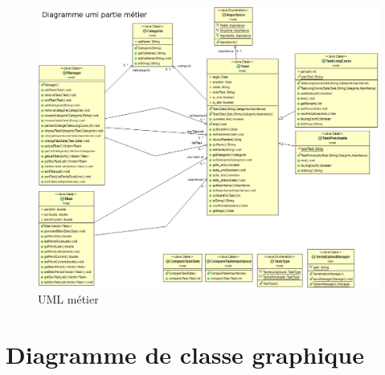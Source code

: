 \documentclass{article}
\makeatletter
\def\bigcentering{\let\\\@centercr\rightskip\@bigflushglue%
\leftskip\@bigflushglue
\parindent\z@\parfillskip\z@skip}
\makeatother
\begin{document}
\begin{figure}[h]
	\bigcentering	
	\includegraphics[scale=0.4]{UML/umlModel.png}
	\caption{UML métier}
	\label{UML metier}
\end{figure}

\clearpage

\section {Diagramme de classe graphique}
\end{document}
